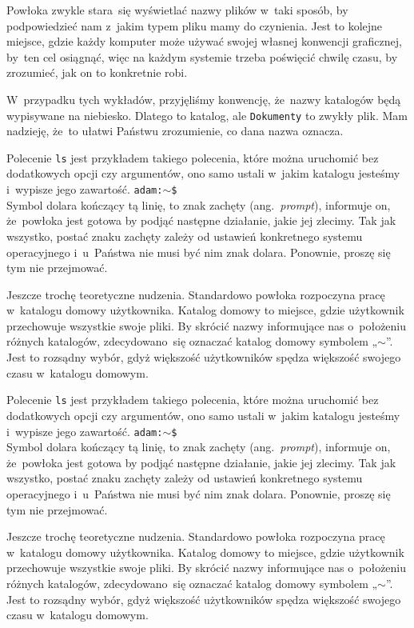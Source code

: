 \documentclass[10pt,t]{beamer}
\begin{document}
\begin{frame}
  Powłoka zwykle stara~się wyświetlać nazwy plików w~taki sposób, by
  podpowiedzieć nam z~jakim typem pliku mamy do czynienia. Jest to kolejne
  miejsce, gdzie każdy komputer może używać swojej własnej konwencji
  graficznej, by~ten cel osiągnąć, więc na każdym systemie trzeba poświęcić
  chwilę czasu, by zrozumieć, jak on to konkretnie robi.

  W~przypadku tych wykładów, przyjęliśmy konwencję, że~nazwy katalogów
  będą wypisywane na niebiesko. Dlatego \texttt{}
  to katalog, ale \texttt{Dokumenty} to zwykły plik. Mam nadzieję, że~to
  ułatwi Państwu zrozumienie, co dana nazwa oznacza.



  Polecenie \texttt{ls} jest przykładem takiego polecenia, które można
  uruchomić bez dodatkowych opcji czy argumentów, ono samo ustali w~jakim
  katalogu jesteśmy i~wypisze jego zawartość.
  \texttt{adam:$\sim$\$} \\
  Symbol dolara kończący tą linię, to znak zachęty (ang.~\textit{prompt}),
  informuje on, że~powłoka jest gotowa by podjąć następne działanie, jakie
  jej zlecimy. Tak jak wszystko, postać znaku zachęty zależy od ustawień
  konkretnego systemu operacyjnego i~u~Państwa nie musi być nim znak dolara.
  Ponownie, proszę się tym nie przejmować.

  Jeszcze trochę teoretyczne nudzenia. Standardowo powłoka rozpoczyna pracę
  w~katalogu domowy użytkownika. Katalog domowy to miejsce, gdzie użytkownik
  przechowuje wszystkie swoje pliki. By skrócić nazwy informujące nas
  o~położeniu różnych katalogów, zdecydowano~się oznaczać katalog domowy
  symbolem „$\sim$”. Jest to rozsądny wybór, gdyż większość użytkowników
  spędza większość swojego czasu w~katalogu domowym.

  Polecenie \texttt{ls} jest przykładem takiego polecenia, które można
  uruchomić bez dodatkowych opcji czy argumentów, ono samo ustali w~jakim
  katalogu jesteśmy i~wypisze jego zawartość.
  \texttt{adam:$\sim$\$} \\
  Symbol dolara kończący tą linię, to znak zachęty (ang.~\textit{prompt}),
  informuje on, że~powłoka jest gotowa by podjąć następne działanie, jakie
  jej zlecimy. Tak jak wszystko, postać znaku zachęty zależy od ustawień
  konkretnego systemu operacyjnego i~u~Państwa nie musi być nim znak dolara.
  Ponownie, proszę się tym nie przejmować.

  Jeszcze trochę teoretyczne nudzenia. Standardowo powłoka rozpoczyna pracę
  w~katalogu domowy użytkownika. Katalog domowy to miejsce, gdzie użytkownik
  przechowuje wszystkie swoje pliki. By skrócić nazwy informujące nas
  o~położeniu różnych katalogów, zdecydowano~się oznaczać katalog domowy
  symbolem „$\sim$”. Jest to rozsądny wybór, gdyż większość użytkowników
  spędza większość swojego czasu w~katalogu domowym.




\end{frame}
\end{document}
